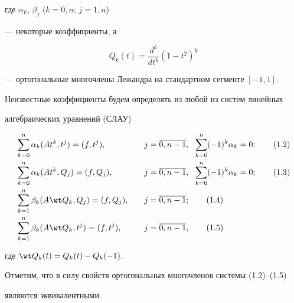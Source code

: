 где $\alpha_k$, $\beta_j$ ($k=\overline{0,n}$; $j=\overline{1,n}$)


--- некоторые коэффициенты, а 


$$


Q_k(t)=\frac{d^k}{dt^k}(1-t^2)^k


$$


--- ортогональные многочлены Лежандра на стандартном сегменте $[-1,1]$. 


Неизвестные коэффициенты будем определять из любой из систем линейных


алгебраических уравнений (СЛАУ)


\begin{alignat}{2}


&\sum_{k=0}^{n}\alpha_k(At^k,t^j)=(f,t^j),&\quad j&=\overline{0,n-1},


\ \ \sum^n_{k=0}(-1)^k\alpha_k=0; \tag{1.2} \\


%


&\sum_{k=0}^{n}\alpha_k(At^k,Q_j)=(f,Q_j),&\quad j&=\overline{0,n-1},


\ \ \sum^n_{k=0}(-1)^k\alpha_k=0;  \tag{1.3} \\


%


&\sum_{k=1}^{n}\beta_k(A\wt Q_k,Q_j)=(f,Q_j),&\quad j&=\overline{0,n-1};


\tag{1.4} \\


%


&\sum_{k=1}^{n}\beta_k(A\wt Q_k,t^j)=(f,t^j),&\quad j&=\overline{0,n-1},


\tag{1.5}


\end{alignat}


где $\wt Q_k(t)=Q_k(t)-Q_k(-1)$.





Отметим, что в силу свойств ортогональных многочленов системы (1.2)--(1.5) 


являются эквивалентными.






